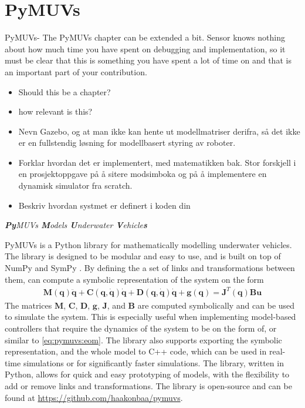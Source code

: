 \chapter{PyMUVs}

{
\color{red}
PyMUVs-
The PyMUVs chapter can be extended a bit. Sensor knows nothing about how much time you have spent on debugging and implementation, so it must be clear that this is something you have spent a lot of time on and that is an important part of your contribution.
\begin{itemize}
    \item Should this be a chapter?
    \item how relevant is this?
    \item Nevn Gazebo, og at man ikke kan hente ut modellmatriser derifra, så det ikke er en fullstendig løsning for modellbasert styring av roboter.
    \item Forklar hvordan det er implementert, med matematikken bak. Stor forskjell i en prosjektoppgave på å sitere modsimboka og på å implementere en dynamisk simulator fra scratch.
    \item Beskriv hvordan systmet er definert i koden din
\end{itemize}
}

\emph{\textbf{Py}MUVs \textbf{M}odels \textbf{U}nderwater \textbf{V}ehicle\textbf{s}}
\newline

PyMUVs is a Python library for mathematically modelling underwater vehicles. The
library is designed to be modular and easy to use, and is built on top of NumPy
\cite{numpy} and SymPy \cite{sympy}. By defining the a set of links and transformations
between them, \pymuvs can compute a symbolic representation of the system on the
form
\begin{align}
    \bm{M}(\bm{q}) \ddot{\bm{q}} + \bm{C}(\bm{q}, \dot{\bm{q}}) \dot{\bm{q}} +
    \bm{D}(\bm{q}, \dot{\bm{q}}) \dot{\bm{q}} + \bm{g}(\bm{q}) = \bm{J}^T(\bm{q}) \bm{B} \bm{u}
    \label{eq:pymuvs:eom}
\end{align}
The matrices $\bm{M}$, $\bm{C}$, $\bm{D}$, $\bm{g}$, $\bm{J}$, and $\bm{B}$ are
computed symbolically and can be used to simulate the system. This is especially
useful when implementing model-based controllers that require the dynamics of the
system to be on the form of, or similar to \autoref{eq:pymuvs:eom}. The library
also supports exporting the symbolic representation, and the whole model to C++
code, which can be used in real-time simulations or for significantly faster
simulations.
The library, written in Python, allows for quick and easy prototyping of
models, with the flexibility to add or remove links and transformations.
The library is open-source and can be found at
\url{https://github.com/haakonbaa/pymuvs}. 

